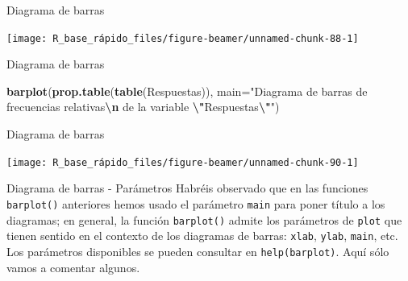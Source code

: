 \documentclass[
  ignorenonframetext,
  aspectratio=169]{beamer}
\newenvironment{Shaded}{\begin{snugshade}}{\end{snugshade}}
\newcommand{\AttributeTok}[1]{\textcolor[rgb]{0.13,0.29,0.53}{#1}}
\newcommand{\FunctionTok}[1]{\textcolor[rgb]{0.13,0.29,0.53}{\textbf{#1}}}
\newcommand{\NormalTok}[1]{#1}
\newcommand{\SpecialCharTok}[1]{\textcolor[rgb]{0.81,0.36,0.00}{\textbf{#1}}}
\newcommand{\StringTok}[1]{\textcolor[rgb]{0.31,0.60,0.02}{#1}}
\begin{document}
\begin{frame}{Diagrama de barras}
\label{diagrama-de-barras-2}
\begin{center}\texttt{[image: R\_base\_rápido\_files/figure-beamer/unnamed-chunk-88-1]} \end{center}
\end{frame}

\begin{frame}[fragile]{Diagrama de barras}
\label{diagrama-de-barras-3}
\begin{Shaded}
\begin{Highlighting}[]
\FunctionTok{barplot}\NormalTok{(}\FunctionTok{prop.table}\NormalTok{(}\FunctionTok{table}\NormalTok{(Respuestas)), }
\AttributeTok{main=}\StringTok{"Diagrama de barras de frecuencias }
\StringTok{      relativas}\SpecialCharTok{\textbackslash{}n}\StringTok{ de la variable }\SpecialCharTok{\textbackslash{}"}\StringTok{Respuestas}\SpecialCharTok{\textbackslash{}"}\StringTok{"}\NormalTok{)}
\end{Highlighting}
\end{Shaded}
\end{frame}

\begin{frame}{Diagrama de barras}
\label{diagrama-de-barras-4}
\begin{center}\texttt{[image: R\_base\_rápido\_files/figure-beamer/unnamed-chunk-90-1]} \end{center}
\end{frame}

\begin{frame}[fragile]{Diagrama de barras - Parámetros}
\label{diagrama-de-barras---paruxe1metros}
Habréis observado que en las funciones \texttt{barplot()} anteriores
hemos usado el parámetro \texttt{main} para poner título a los
diagramas; en general, la función \texttt{barplot()} admite los
parámetros de \texttt{plot} que tienen sentido en el contexto de los
diagramas de barras: \texttt{xlab}, \texttt{ylab}, \texttt{main}, etc.
Los parámetros disponibles se pueden consultar en
\texttt{help(barplot)}. Aquí sólo vamos a comentar algunos.
\end{frame}
\end{document}
